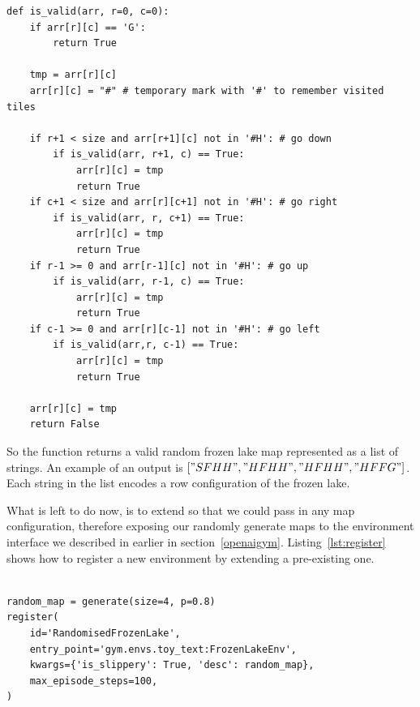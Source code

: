 \begin{minipage}{\linewidth}
\lstset{language=Python}
\lstset{frame=lines}
\lstset{basicstyle=\footnotesize}
\begin{lstlisting}
def is_valid(arr, r=0, c=0):
    if arr[r][c] == 'G':
        return True

    tmp = arr[r][c]
    arr[r][c] = "#" # temporary mark with '#' to remember visited tiles
    
    if r+1 < size and arr[r+1][c] not in '#H': # go down
        if is_valid(arr, r+1, c) == True:
            arr[r][c] = tmp
            return True
    if c+1 < size and arr[r][c+1] not in '#H': # go right
        if is_valid(arr, r, c+1) == True:
            arr[r][c] = tmp
            return True
    if r-1 >= 0 and arr[r-1][c] not in '#H': # go up
        if is_valid(arr, r-1, c) == True:
            arr[r][c] = tmp
            return True
    if c-1 >= 0 and arr[r][c-1] not in '#H': # go left
        if is_valid(arr,r, c-1) == True:
            arr[r][c] = tmp
            return True
            
    arr[r][c] = tmp
    return False
\end{lstlisting}
\end{minipage}

So the  function returns a valid random frozen lake map represented as a list of strings. An example of an output is $["SFHH", "HFHH", "HFHH", "HFFG"]$. Each string in the list encodes a row configuration of the frozen lake.

What is left to do now, is to extend  so that we could pass in any map configuration, therefore exposing our randomly generate maps to the  environment interface we described in earlier in section~\ref{openaigym}. Listing~\ref{lst:register} shows how to register a new environment by extending a pre-existing one.
\\\\
\begin{minipage}{\linewidth}
\lstset{language=Python}
\lstset{frame=lines}
\lstset{basicstyle=\footnotesize}
\begin{lstlisting}
random_map = generate(size=4, p=0.8)
register(
    id='RandomisedFrozenLake',
    entry_point='gym.envs.toy_text:FrozenLakeEnv',
    kwargs={'is_slippery': True, 'desc': random_map},
    max_episode_steps=100,
)
\end{lstlisting}
\end{minipage}

